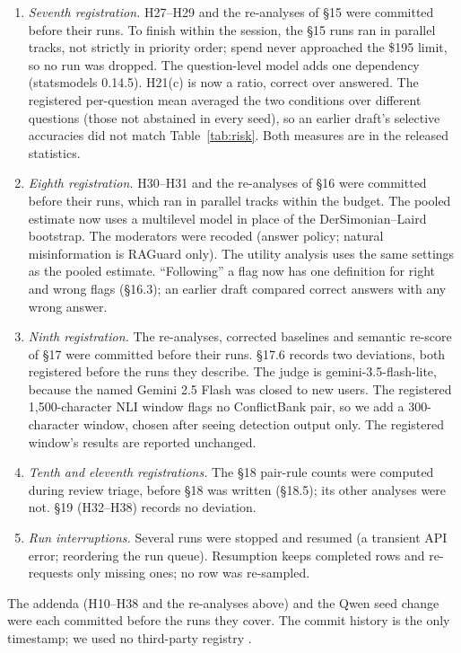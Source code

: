 \begin{enumerate}[leftmargin=*,itemsep=1pt,topsep=2pt]
(credit for naming the false side where the generator errs, charge for marking a correct passage where it is right)
were defined after seeing the H24 cells and are exploratory.
\item \emph{Seventh registration.} H27--H29 and the re-analyses of \S15 were committed before their runs. To finish
within the session, the \S15 runs ran in parallel tracks, not strictly in priority order; spend never
approached the \$195 limit, so no run was dropped. The question-level model adds one dependency (statsmodels 0.14.5).
H21(c) is now a ratio, correct over answered. The registered per-question mean averaged the two conditions
over different questions (those not abstained in every seed), so an earlier draft's selective accuracies did
not match Table~\ref{tab:risk}. Both measures are in the released statistics.
\item \emph{Eighth registration.} H30--H31 and the re-analyses of \S16 were committed before their runs, which
ran in parallel tracks within the budget. The pooled estimate now uses a multilevel model in place of the
DerSimonian--Laird bootstrap. The moderators were recoded (answer policy; natural misinformation is RAGuard only).
The utility analysis uses the same settings as the pooled estimate. ``Following'' a flag now has one definition for
right and wrong flags (\S16.3); an earlier draft compared correct answers with any wrong answer.
\item \emph{Ninth registration.} The re-analyses, corrected baselines and semantic re-score of \S17 were committed
before their runs. \S17.6 records two deviations, both registered before the runs they describe. The judge is
gemini-3.5-flash-lite, because the named Gemini 2.5 Flash was closed to new users. The registered
1,500-character NLI window flags no ConflictBank pair, so we add a 300-character window, chosen after seeing
detection output only. The registered window's results are reported unchanged.
\item \emph{Tenth and eleventh registrations.} The \S18 pair-rule counts were computed during review triage, before
\S18 was written (\S18.5); its other analyses were not. \S19 (H32--H38) records no deviation.
\item \emph{Run interruptions.} Several runs were stopped and resumed (a transient API error; reordering the run
queue). Resumption keeps completed rows and re-requests only missing ones; no row was re-sampled.
\end{enumerate}
The addenda (H10--H38 and the re-analyses above) and the Qwen seed change were each committed before
the runs they cover. The commit history is the only timestamp; we used no third-party registry
\citep{vanmiltenburg2021preregistering}.

